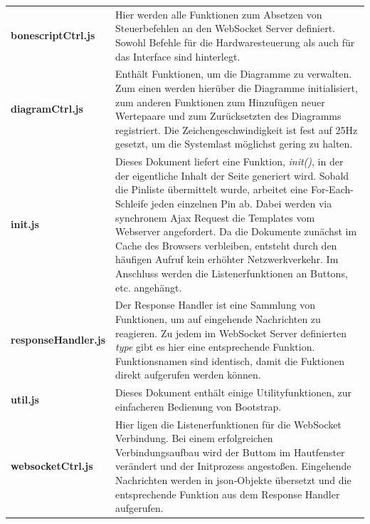 \documentclass[thesis.tex]{subfiles}
\begin{document}
\begin{longtabu} to \textwidth {
X[1]
X[3]}
\textbf{bonescriptCtrl.js} & Hier werden alle Funktionen zum Absetzen von Steuerbefehlen an den WebSocket Server definiert. Sowohl Befehle für die Hardwaresteuerung als auch für das Interface sind hinterlegt.\newline\\

\textbf{diagramCtrl.js} & Enthält Funktionen, um die Diagramme zu verwalten. Zum einen werden hierüber die Diagramme initialisiert, zum anderen Funktionen zum Hinzufügen neuer Wertepaare und zum Zurücksetzten des Diagramms registriert. Die Zeichengeschwindigkeit ist fest auf 25Hz gesetzt, um die Systemlast möglichst gering zu halten.\newline\\

\textbf{init.js} & Dieses Dokument liefert eine Funktion, \textit{init()}, in der der eigentliche Inhalt der Seite generiert wird. Sobald die Pinliste übermittelt wurde, arbeitet eine For-Each-Schleife jeden einzelnen Pin ab. Dabei werden via synchronem Ajax Request die Templates vom Webserver angefordert. Da die Dokumente zunächst im Cache des Browsers verbleiben, entsteht durch den häufigen Aufruf kein erhöhter Netzwerkverkehr. Im Anschluss werden die Listenerfunktionen an Buttons, etc. angehängt.\newline\\

\textbf{responseHandler.js} & Der Response Handler ist eine Sammlung von Funktionen, um auf eingehende Nachrichten zu reagieren. Zu jedem im WebSocket Server definierten \textit{type} gibt es hier eine entsprechende Funktion. Funktionsnamen sind identisch, damit die Fuktionen direkt aufgerufen werden können.\newline\\

\textbf{util.js} & Dieses Dokument enthält einige Utilityfunktionen, zur einfacheren Bedienung von Bootstrap.\newline\\

\textbf{websocketCtrl.js} & Hier ligen die Listenerfunktionen für die WebSocket Verbindung. Bei einem erfolgreichen Verbindungsaufbau wird der Buttom im Hautfenster verändert und der Initprozess angestoßen. Eingehende Nachrichten werden in \gls{json}-Objekte übersetzt und die entsprechende Funktion aus dem Response Handler aufgerufen.\newline\\
\end{longtabu}
\end{document}
